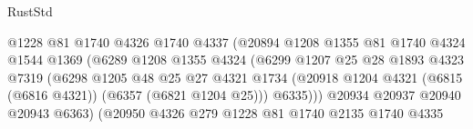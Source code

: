 \begin{lexlean}{RustStd}
\begin{coremodule}
                                        @1228
                                        @81
                                        @1740
                                        @4326
                                        @1740
                                        @4337
                                        (@20894
                                          @1208
                                          @1355
                                          @81
                                          @1740
                                          @4324
                                          @1544
                                          @1369
                                          (@6289
                                            @1208
                                            @1355
                                            @4324
                                            (@6299
                                              @1207
                                              @25
                                              @28
                                              @1893
                                              @4323
                                              @7319
                                              (@6298
                                                @1205
                                                @48
                                                @25
                                                @27
                                                @4321
                                                @1734
                                                (@20918
                                                  @1204
                                                  @4321
                                                  (@6815 (@6816 @4321))
                                                  (@6357 (@6821 @1204 @25)))
                                                @6335)))
                                          @20934
                                          @20937
                                          @20940
                                          @20943
                                          @6363)
                                        (@20950
                                          @4326
                                          @279
                                          @1228
                                          @81
                                          @1740
                                          @2135
                                          @1740
                                          @4335

\end{coremodule}
\end{lexlean}
